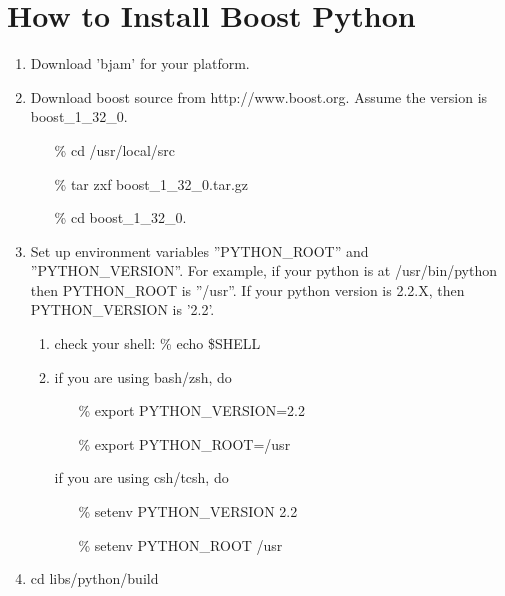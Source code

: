 %


\section{How to Install Boost Python}
\label{HELP-OPT-PROG-INST}
  \begin{enumerate}
    \item
      Download 'bjam' for your platform.
    \item
      Download boost source from http://www.boost.org. Assume the
      version is boost\_1\_32\_0.

      \begin{itemize} 
        \item[\%] cd /usr/local/src
	\item[\%] tar zxf boost\_1\_32\_0.tar.gz
	\item[\%] cd boost\_1\_32\_0.
      \end{itemize}
      \normalcolor

    \item
      Set up environment variables ''PYTHON\_ROOT'' and ''PYTHON\_VERSION''.
       For example, if your python is at /usr/bin/python then PYTHON\_ROOT is
       ''/usr''. If your python version is 2.2.X, then PYTHON\_VERSION
       is '2.2'.
       \begin{enumerate}
       \item 
	 check your shell: {\% echo \$SHELL}
       
       \item
	 if you are using bash/zsh, do

	 \begin{itemize}
           \item[\%] export PYTHON\_VERSION=2.2
           \item[\%] export PYTHON\_ROOT=/usr
	 \end{itemize}
	 \normalcolor

          if you are using csh/tcsh, do

	  \begin{itemize}
            \item[\%] setenv PYTHON\_VERSION 2.2
            \item[\%] setenv PYTHON\_ROOT /usr
	  \end{itemize}
	  \normalcolor
       \end{enumerate}

     \item
	  { cd libs/python/build}
    

\end{enumerate}

